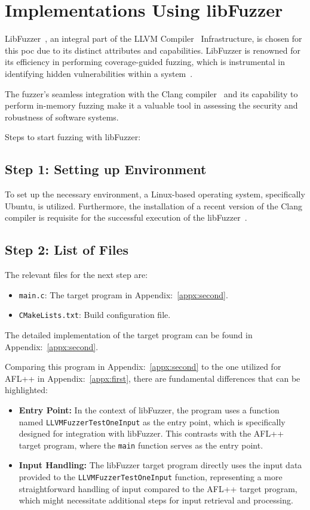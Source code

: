 \section{Implementations Using libFuzzer}
LibFuzzer~\cite{libFuzze17:online}, an integral part of the LLVM Compiler~\cite{libFuzze42:online} Infrastructure,
is chosen for this \acrlong{poc} due to its distinct attributes and capabilities.
LibFuzzer is renowned for its efficiency in performing coverage-guided fuzzing,
which is instrumental in identifying hidden vulnerabilities within a system~\cite{fuzzingt51:online}.

The fuzzer's seamless integration with the Clang compiler~\cite{ClangCLa81:online} and its capability
to perform in-memory fuzzing make it a valuable tool in assessing the security
and robustness of software systems.

Steps to start fuzzing with libFuzzer:

\subsection*{Step 1: Setting up Environment}
To set up the necessary environment, a Linux-based operating system,
specifically Ubuntu, is utilized. Furthermore, the installation of a recent
version of the Clang compiler is requisite for the successful execution of the
libFuzzer~\cite{ClangCLa81:online}.

\subsection*{Step 2: List of Files}
The relevant files for the next step are:
\begin{itemize}
    \item \texttt{main.c}: The target program in Appendix:~\ref{appx:second}.
    \item \texttt{CMakeLists.txt}: Build configuration file.
\end{itemize}

The detailed implementation of the target program can be
found in Appendix:~\ref{appx:second}.

Comparing this program in Appendix:~\ref{appx:second} to the one utilized for
AFL++ in Appendix:~\ref{appx:first}, there are fundamental differences that
can be highlighted:


\begin{itemize}
    \item \textbf{Entry Point:} In the context of libFuzzer, the program uses a function
    named \texttt{LLVMFuzzerTestOneInput} as the entry point,
    which is specifically designed for integration with libFuzzer.
    This contrasts with the AFL++ target program, where the
    \texttt{main} function serves as the entry point.
    \item \textbf{Input Handling:} The libFuzzer target program directly uses
    the input data provided to the \texttt{LLVMFuzzerTestOneInput} function,
    representing a more straightforward handling of input compared to the
    AFL++ target program, which might necessitate additional steps for input
    retrieval and processing.
\end{itemize}

